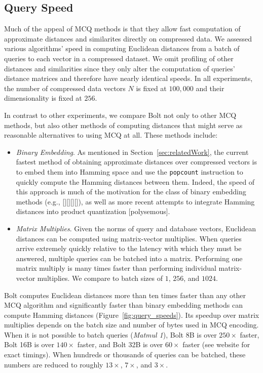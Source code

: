 

\subsection{Query Speed}

Much of the appeal of MCQ methods is that they allow fast computation of approximate distances and similarites directly on compressed data. We assessed various algorithms' speed in computing Euclidean distances from a batch of queries to each vector in a compressed dataset. We omit profiling of other distances and similarities since they only alter the computation of queries' distance matrices and therefore have nearly identical speeds. In all experiments, the number of compressed data vectors $N$ is fixed at $100,000$ and their dimensionality is fixed at $256$.

In contrast to other experiments, we compare Bolt not only to other MCQ methods, but also other methods of computing distances that might serve as reasonable alternatives to using MCQ at all. These methods include:
\begin{itemize}
    \item \textit{Binary Embedding}. As mentioned in Section~\ref{sec:relatedWork}, the current fastest method of obtaining approximate distances over compressed vectors is to embed them into Hamming space and use the \texttt{popcount} instruction to quickly compute the Hamming distances between them. Indeed, the speed of this approach is much of the motivation for the class of binary embedding methods (e.g., [][][][]), as well as more recent attempts to integrate Hamming distances into product quantization [polysemous].
    \item \textit{Matrix Multiplies}. Given the norms of query and database vectors, Euclidean distances can be computed using matrix-vector multiplies. When queries arrive extremely quickly relative to the latency with which they must be answered, multiple queries can be batched into a matrix. Performing one matrix multiply is many times faster than performing individual matrix-vector multiplies. We compare to batch sizes of $1$, $256$, and $1024$.
\end{itemize}

Bolt computes Euclidean distances more than ten times faster than any other MCQ algorithm and significantly faster than binary embedding methods can compute Hamming distances (Figure~\ref{fig:query_speeds}). Its speedup over matrix multiplies depends on the batch size and number of bytes used in MCQ encoding. When it is not possible to batch queries (\textit{Matmul 1}), Bolt 8B is over $250\times$ faster, Bolt 16B is over $140\times$ faster, and Bolt 32B is over $60\times$ faster (see website for exact timings). When hundreds or thousands of queries can be batched, these numbers are reduced to roughly $13\times$, $7\times$, and $3\times$.

